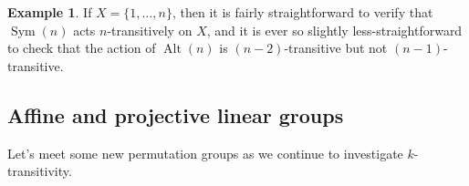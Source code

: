 \documentclass[11pt]{amsart}
\theoremstyle{plain}
\theoremstyle{definition}
\newtheorem{example}{Example}
\theoremstyle{remark}
\DeclareMathOperator{\Sym}{Sym}
\DeclareMathOperator{\Alt}{Alt}
\begin{document}
\begin{example}\label{exam.SymAltKTrans}
If $X = \{1,\ldots,n\}$, then it is fairly straightforward to verify that $\Sym(n)$ acts $n$-transitively on $X$, and it is ever so slightly less-straightforward to check that the action of $\Alt(n)$ is $(n-2)$-transitive but not $(n-1)$-transitive. 
\end{example}

\subsection{Affine and projective linear groups}

Let's meet some new permutation groups as we continue to investigate $k$-transitivity. 
\end{document}
